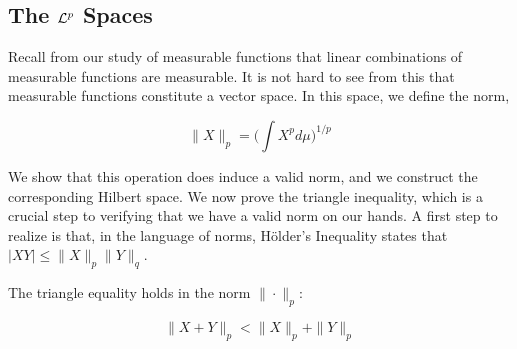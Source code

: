     \subsection{The $\mathcal L^p$ Spaces}

    Recall from our study of 
    measurable functions that linear combinations of measurable functions 
    are measurable. It is not hard to see from this that measurable functions constitute 
    a vector space. In this space, we define the norm,

    \[ \|X\|_p = \bigg(\int X^p d\mu \bigg)^{1/p} \]

    We show that this operation does induce a valid norm, and we construct the corresponding 
    Hilbert space. We now prove the triangle inequality, which is a crucial step to verifying that 
    we have a valid norm on our hands. A first step to realize is that, 
    in the language of norms, Hölder's Inequality states that $|XY| \leq \|X\|_p\|Y\|_q$.

    \begin{theorem}
        The triangle equality holds in the norm $\|\cdot\|_p$: 

        \[ \|X + Y\|_p < \|X\|_p + \|Y\|_p \] 

    \end{theorem}

